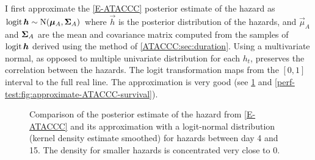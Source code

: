 \documentclass[thesis.tex]{subfiles}
\begin{document}
I first approximate the \cref{E-ATACCC} posterior estimate of the hazard as $\operatorname{logit}{\bm{h}} \sim \operatorname{N}(\bm{\mu}_A, \bm{\Sigma}_A)$ where $\vec{h}$ is the posterior distribution of the hazards, and $\vec{\mu}_A$ and $\bm{\Sigma}_A$ are the mean and covariance matrix computed from the samples of $\operatorname{logit}{\bm{h}}$ derived using the method of \cref{ATACCC:sec:duration}.
Using a multivariate normal, as opposed to multiple univariate distribution for each $h_t$, preserves the correlation between the hazards.
The logit transformation maps from the $[0, 1]$ interval to the full real line.
The approximation is very good (see \cref{perf-test:fig:approximate-ATACCC-hazard} and \cref{perf-test:fig:approximate-ATACCC-survival}).
\begin{figure}
  \caption[Approximating the ATACCC posterior hazard as a logit-normal]{Comparison of the posterior estimate of the hazard from \cref{E-ATACCC} and its approximation with a logit-normal distribution (kernel density estimate smoothed) for hazards between day 4 and 15. The density for smaller hazards is concentrated very close to 0. \label{perf-test:fig:approximate-ATACCC-hazard}}
\end{figure}
\end{document}
